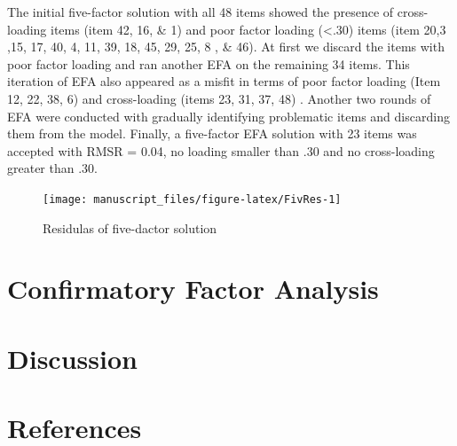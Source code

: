 \documentclass[
  english,
  man]{apa6}
\begin{document}
The initial five-factor solution with all 48 items showed the presence of cross-loading items (item 42, 16, \& 1) and poor factor loading (\textless.30) items (item 20,3 ,15, 17, 40, 4, 11, 39, 18, 45, 29, 25, 8 , \& 46). At first we discard the items with poor factor loading and ran another EFA on the remaining 34 items. This iteration of EFA also appeared as a misfit in terms of poor factor loading (Item 12, 22, 38, 6) and cross-loading (items 23, 31, 37, 48) . Another two rounds of EFA were conducted with gradually identifying problematic items and discarding them from the model. Finally, a five-factor EFA solution with 23 items was accepted with RMSR = 0.04, no loading smaller than .30 and no cross-loading greater than .30.

\begin{figure}

{\centering \texttt{[image: manuscript\_files/figure-latex/FivRes-1]} 

}

\caption{ Residulas of five-dactor solution}\label{fig:FivRes}
\end{figure}

\hypertarget{confirmatory-factor-analysis}{%
\section{Confirmatory Factor Analysis}\label{confirmatory-factor-analysis}}

\hypertarget{discussion}{%
\section{Discussion}\label{discussion}}

\newpage

\hypertarget{references}{%
\section{References}\label{references}}

\begingroup
\setlength{\parindent}{-0.5in}
\setlength{\leftskip}{0.5in}
\end{document}
